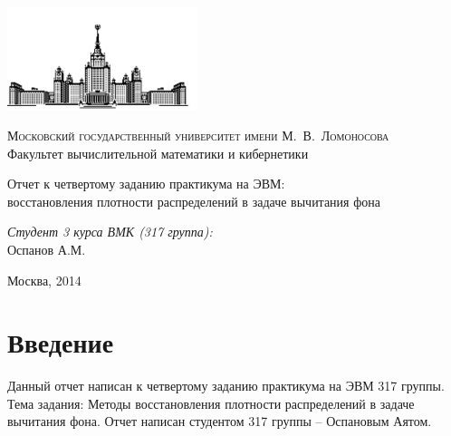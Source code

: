 \documentclass[12pt, a4paper]{article}
\begin{document}
	\thispagestyle{empty}

	\begin{singlespace}
	\begin{titlepage}
		\begin{center}
			\includegraphics[height = 3cm]{msu.png}

			{\scshape Московский государственный университет имени М.~В.~Ломоносова}\\
			Факультет вычислительной математики и кибернетики\\
			\centerline{\hfill\hrulefill\hrulefill\hrulefill\hrulefill\hfill}

			\vfill

			{\LARGE Отчет к четвертому заданию практикума на ЭВМ: \\  { восстановления плотности распределений в задаче вычитания фона}}

			\vspace{1cm}

		\end{center}

		\vfill
		\begin{flushright}
			\textit{Студент 3 курса ВМК (317 группа):}\\
				Оспанов А.М.

			\vspace{5mm}

		\end{flushright}

		\vfill

		\begin{center}
		Москва, 2014
		\end{center}
	\end{titlepage}
	\end{singlespace}

	\tableofcontents


	\newpage
	\section{Введение}
		Данный отчет написан к четвертому заданию практикума на ЭВМ 317 группы. Тема задания:  Методы восстановления плотности распределений в задаче
вычитания фона. Отчет написан студентом 317 группы -- Оспановым Аятом.
\end{document}
